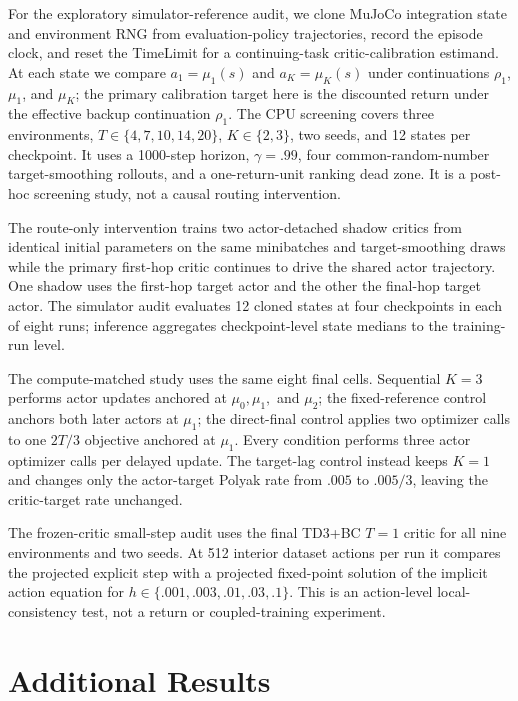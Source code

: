 For the exploratory simulator-reference audit, we clone MuJoCo integration
state and environment RNG from evaluation-policy trajectories, record the
episode clock, and reset the TimeLimit for a continuing-task critic-calibration
estimand. At each state we compare $a_1=\mu_1(s)$ and
$a_K=\mu_K(s)$ under continuations $\rho_1$, $\mu_1$, and $\mu_K$; the
primary calibration target here is the discounted return under the effective
backup continuation $\rho_1$. The CPU screening covers three environments,
$T\in\{4,7,10,14,20\}$, $K\in\{2,3\}$, two seeds, and 12 states per
checkpoint. It uses a 1000-step horizon, $\gamma=.99$, four common-random-number
target-smoothing rollouts, and a one-return-unit ranking dead zone. It is a
post-hoc screening study, not a causal routing intervention.

The route-only intervention trains two actor-detached shadow critics from identical initial parameters on the same minibatches and target-smoothing draws while the primary first-hop critic continues to drive the shared actor trajectory. One shadow uses the first-hop target actor and the other the final-hop target actor. The simulator audit evaluates 12 cloned states at four checkpoints in each of eight runs; inference aggregates checkpoint-level state medians to the training-run level.

The compute-matched study uses the same eight final cells. Sequential $K=3$ performs actor updates anchored at $\mu_0,\mu_1,$ and $\mu_2$; the fixed-reference control anchors both later actors at $\mu_1$; the direct-final control applies two optimizer calls to one $2T/3$ objective anchored at $\mu_1$. Every condition performs three actor optimizer calls per delayed update. The target-lag control instead keeps $K=1$ and changes only the actor-target Polyak rate from $.005$ to $.005/3$, leaving the critic-target rate unchanged.

The frozen-critic small-step audit uses the final TD3+BC $T=1$ critic for all nine environments and two seeds. At 512 interior dataset actions per run it compares the projected explicit step with a projected fixed-point solution of the implicit action equation for $h\in\{.001,.003,.01,.03,.1\}$. This is an action-level local-consistency test, not a return or coupled-training experiment.

\section{Additional Results}
\label{app:results}

